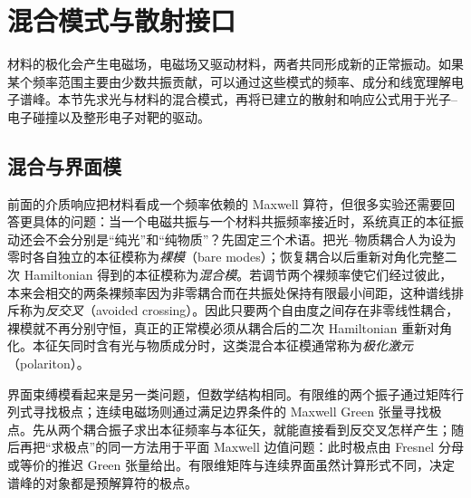 \section{混合模式与散射接口}

材料的极化会产生电磁场，电磁场又驱动材料，两者共同形成新的正常振动。如果某个频率范围主要由少数共振贡献，可以通过这些模式的频率、成分和线宽理解电子谱峰。本节先求光与材料的混合模式，再将已建立的散射和响应公式用于光子--电子碰撞以及整形电子对靶的驱动。

\subsection{混合与界面模}

前面的介质响应把材料看成一个频率依赖的 Maxwell 算符，但很多实验还需要回答更具体的问题：当一个电磁共振与一个材料共振频率接近时，系统真正的本征振动还会不会分别是“纯光”和“纯物质”？先固定三个术语。把光--物质耦合人为设为零时各自独立的本征模称为\emph{裸模}（bare modes）；恢复耦合以后重新对角化完整二次 Hamiltonian 得到的本征模称为\emph{混合模}。若调节两个裸频率使它们经过彼此，本来会相交的两条裸频率因为非零耦合而在共振处保持有限最小间距，这种谱线排斥称为\emph{反交叉}（avoided crossing）。因此只要两个自由度之间存在非零线性耦合，裸模就不再分别守恒，真正的正常模必须从耦合后的二次 Hamiltonian 重新对角化。本征矢同时含有光与物质成分时，这类混合本征模通常称为\emph{极化激元}（polariton）。

界面束缚模看起来是另一类问题，但数学结构相同。有限维的两个振子通过矩阵行列式寻找极点；连续电磁场则通过满足边界条件的 Maxwell Green 张量寻找极点。先从两个耦合振子求出本征频率与本征矢，就能直接看到反交叉怎样产生；随后再把“求极点”的同一方法用于平面 Maxwell 边值问题：此时极点由 Fresnel 分母或等价的推迟 Green 张量给出。有限维矩阵与连续界面虽然计算形式不同，决定谱峰的对象都是预解算符的极点。

